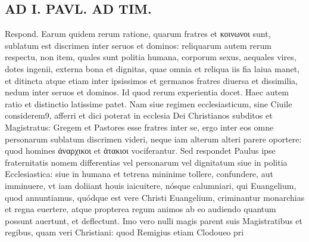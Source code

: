\documentclass{article}
\begin{document}
\begin{pages}
\section*{AD I. PAVL. AD TIM. }
\marginpar{[ p.420 ]}\pstart Respond. Earum quidem rerum ratione, quarum fratres et κοινωνοι sunt, sublatum est discrimen inter seruos et dominos: reliquarum autem rerum respectu, non item, quales sunt politia humana, corporum sexus, aequales vires, dotes ingenii, externa bona et dignitas, quae omnia et reliqua iis fia laiua manet, et ditincta atque  etiam inter ipsissimos et germanos fratres diuersa et dissimilia, nedum inter seruos et dominos. Id quod rerum experientia docet.  \pend\pstart Haec autem ratio et distinctio latissime patet. Nam siue regimen ecclesiasticum, sine Ciuile considerem9, afferri et dici poterat in ecclesia Dei Christianos subditos et Magistratus: Gregem et Pastores esse fratres inter se, ergo inter eos omne personarum sublatum discrimen videri, neque iam alterum alteri parere oportere: quod homines ἀναρχικοι et ἀτακιοι vociferantur. Sed respondet Paulus ipse fraternitatis nomem differentias vel personarum vel dignitatum siue in politia Ecclesiastica: siue in humana et tetrena mininime tollere, confundere, aut imminuere, vt iam doliiant houis iaicuitere, nósque calumniari, qui Euangelium, quod annuntiamus, quódque est vere Christi Euangelium, criminantur monarchias et regna euertere, atque propterea regum animos ab eo audiendo quantum possunt auertunt, et deflectunt. Imo vero nulli magis parent suis Magistratibus et regibus, quam veri Christiani: quod Remigius etiam Clodoueo pri\pend

\end{pages}
\end{document}
